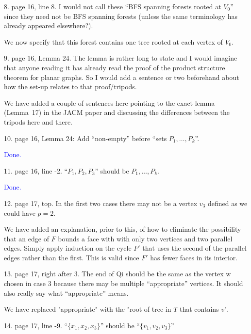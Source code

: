 \documentclass[12pt]{article}
\newcommand{\done}{\textcolor{blue}{Done.}}
\newenvironment{response}{\color{blue}}{}
\begin{document}
8. page 16, line 8. I would not call these “BFS spanning forests rooted
at $V_0$” since they need not be BFS spanning forests (unless the same
terminology has already appeared elsewhere?).

\begin{response}
  We now specify that this forest contains one tree rooted at each vertex of $V_0$.
\end{response}

9. page 16, Lemma 24. The lemma is rather long to state and I would
imagine that anyone reading it has already read the proof of the product
structure theorem for planar graphs. So I would add a sentence or two
beforehand about how the set-up relates to that proof/tripods.

\begin{response}
  We have added a couple of sentences here pointing to the exact lemma (Lemma~17) in the JACM paper and discussing the differences between the tripods here and there.
\end{response}

10. page 16, Lemma 24: Add “non-empty” before “sets $P_1,\dots,P_k$”.

\done

11. page 16, line -2. “$P_1, P_2, P_3$” should be $P_1,\dots,P_k$.

\done

12. page 17, top. In the first two cases there may not be a vertex $v_3$ defined
as we could have $p=2$.

\begin{response}
  We have added an explanation, prior to this, of how to eliminate the possibility that an edge of $F$ bounds a face with with only two vertices and two parallel edges.  Simply apply induction on the cycle $F'$ that uses the second of the parallel edges rather than the first.  This is valid since $F'$ has fewer faces in its interior.
\end{response}


13. page 17, right after 3. The end of Qi should be the same as the vertex w
chosen in case 3 because there may be multiple “appropriate” vertices.
It should also really say what “appropriate” means.

\begin{response}
  We have replaced "appropriate" with the "root of tree in $T$ that contains $v$".
\end{response}


14. page 17, line -9. “$\{x_1, x_2, x_3\}$” should be “$\{v_1, v_2, v_3\}$”
\end{document}
